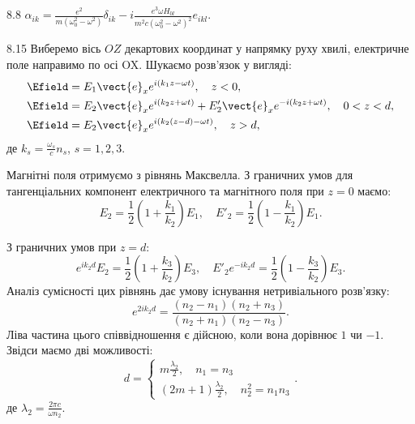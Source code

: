 \protect \section *{}
\begin{Solution}{8.{8}}
	$\alpha_{ik} = \frac{e^2}{m(\omega_0^2 - \omega^2)}\delta_{ik} - i \frac{e^3\omega
	H_{0l}}{m^2c(\omega_0^2 - \omega^2)^2}e_{ikl}$.
\end{Solution}
\begin{Solution}{8.{15}}
    Виберемо вісь $OZ$ декартових координат у напрямку руху хвилі, електричне поле направимо по осі
    OX. Шукаємо розв’язок у вигляді:
    \begin{align*}
        \Efield &= E_1\vect{e}_x e^{i(k_1z - \omega t)}, \quad z<0, \\
        \Efield &= E_2\vect{e}_x e^{i(k_2z + \omega t)} + E'_2\vect{e}_x e^{-i(k_2z + \omega t)},
        \quad 0<z<d, \\
        \Efield &= E_2\vect{e}_x e^{i(k_2(z-d) - \omega t)}, \quad z>d,
    \end{align*}
    де $k_s = \frac{\omega_s}{c}n_s$, $s = 1,2,3$.

    Магнітні поля отримуємо з рівнянь Максвелла. З граничних умов для тангенціальних компонент
    електричного та магнітного поля при $z = 0$ маємо:
    \[
        E_2 = \frac{1}{2}\left(1 + \frac{k_1}{k_2} \right){E_1}, \quad E'_2 = \frac{1}{2}\left( 1 -
        \frac{k_1}{k_2} \right){E_1}.
    \]

    З граничних умов при  $z = d$:
    \[
        e^{ik_2d}{E_2} = \frac{1}{2}\left( 1 + \frac{k_3}{k_2} \right)E_3, \quad E'_2e^{- ik_2d} =
        \frac{1}{2}\left( 1 - \frac{k_3}{k_2} \right)E_3.
    \]
    Аналіз сумісності цих рівнянь дає умову існування нетривіального розв’язку:
    \[
        e^{2ik_2d} = \frac{(n_2 - n_1)(n_2 + n_3)}{(n_2 + n_1)(n_2 - n_3)}.
    \]
    Ліва частина цього співвідношення є дійсною, коли вона дорівнює $1$ чи $-1$. Звідси маємо дві
    можливості:
    \begin{equation*}
    d=
    \begin{cases}
    m\frac{\lambda_2}{2}, \quad n_1 = n_3\\
    (2m+1)\frac{\lambda_2}{2}, \quad n_2^2 = n_1n_3
    \end{cases}.
    \end{equation*}
    де $\lambda_2 = \frac{2\pi c}{\omega n_2}$.
\end{Solution}
